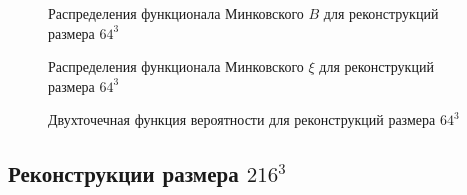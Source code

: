 			\begin{figure}[h]
				\begin{minipage}[h]{0.49\linewidth}
				\end{minipage}
				\hfill
				\begin{minipage}[h]{0.49\linewidth}
				\end{minipage}
				\caption{Распределения функционала Минковского $B$ для реконструкций размера $64^3$}
				\label{5-dist-B-64}
			\end{figure}
		
			\begin{figure}[h]
				\begin{minipage}[h]{0.49\linewidth}
				\end{minipage}
				\hfill
				\begin{minipage}[h]{0.49\linewidth}
				\end{minipage}
				\caption{Распределения функционала Минковского $\xi$ для реконструкций размера $64^3$}
				\label{5-dist-Xi-64}
			\end{figure}
		
			\begin{figure}[h]
				\begin{minipage}[h]{0.49\linewidth}
				\end{minipage}
				\hfill
				\begin{minipage}[h]{0.49\linewidth}
				\end{minipage}
				\caption{Двухточечная функция вероятности для реконструкций размера $64^3$}
				\label{5-prob-64}
			\end{figure}
	
	\subsection{Реконструкции размера $216^3$}
